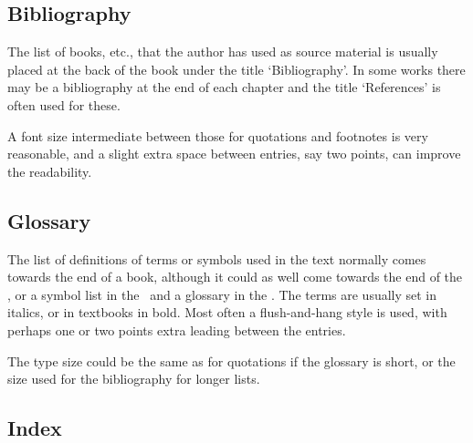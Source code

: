 \documentclass[10pt,a4paper,extrafontsizes]{memoir}
\begin{document}
\subsection{Bibliography}

\begin{paracol}{2}
\switchEng
   The list of books, etc., that the author has used as source material is
usually placed at the back of the book under the title `Bibliography'. In
some works there may be a bibliography at the end of 
each chapter and the title `References' is often used for these.

    A font size intermediate between those for quotations and footnotes is
very reasonable, and a slight extra space between entries, say two points,
can improve the readability.
\end{paracol}

\subsection{Glossary}

\begin{paracol}{2}
\switchEng
   The list of definitions of terms or symbols used in the text normally
comes towards the end of a book, although it could as well come towards
the end of the \pixfrontmatter, or a symbol list 
in the \pixfrontmatter\ and a glossary
in the \pixbackmatter. The terms are usually set in italics, or in textbooks 
in bold. Most often a flush-and-hang style is used, with
perhaps one or two points extra leading between the entries.

    The type size could be the same as for quotations if the glossary is short,
or the size used for the bibliography for longer lists.
\end{paracol}

\subsection{Index}
\end{document}
